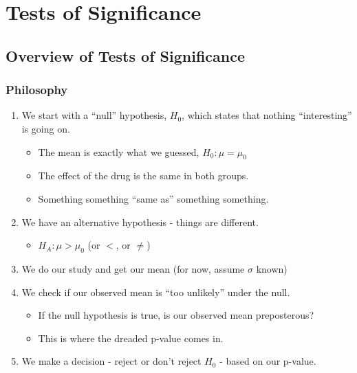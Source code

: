 \documentclass[
  letterpaper,
  DIV=11,
  numbers=noendperiod]{scrreprt}
\providecommand{\tightlist}{%
  \setlength{\itemsep}{0pt}\setlength{\parskip}{0pt}}\usepackage{longtable,booktabs,array}
\begin{document}
\hypertarget{tests-of-significance}{%
\chapter{Tests of Significance}\label{tests-of-significance}}

\hypertarget{overview-of-tests-of-significance}{%
\section{Overview of Tests of
Significance}\label{overview-of-tests-of-significance}}

\hypertarget{philosophy}{%
\subsection{Philosophy}\label{philosophy}}

\begin{enumerate}
\def\labelenumi{\arabic{enumi}.}
\tightlist
\item
  We start with a ``null'' hypothesis, \(H_0\), which states that
  nothing ``interesting'' is going on.

  \begin{itemize}
  \tightlist
  \item
    The mean is exactly what we guessed, \(H_0: \mu = \mu_0\)
  \item
    The effect of the drug is the same in both groups.
  \item
    Something something ``same as'' something something.
  \end{itemize}
\item
  We have an alternative hypothesis - things are different.

  \begin{itemize}
  \tightlist
  \item
    \(H_A: \mu > \mu_0\) (or \(<\), or \(\ne\))
  \end{itemize}
\item
  We do our study and get our mean (for now, assume \(\sigma\) known)
\item
  We check if our observed mean is ``too unlikely'' under the null.

  \begin{itemize}
  \tightlist
  \item
    If the null hypothesis is true, is our observed mean preposterous?
  \item
    This is where the dreaded p-value comes in.
  \end{itemize}
\item
  We make a decision - reject or don't reject \(H_0\) - based on our
  p-value.
\end{enumerate}
\end{document}
